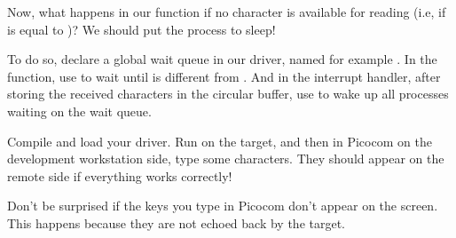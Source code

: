 Now, what happens in our  function if no character is available
for reading (i.e, if  is equal to )? We
should put the process to sleep!

To do so, declare a global wait queue in our driver, named for example
. In the  function, use 
to wait until  is different from . And
in the interrupt handler, after storing the received characters in the
circular buffer, use  to wake up all processes waiting on
the wait queue.

Compile and load your driver. Run  on the target,
and then in Picocom on the development workstation side, type some
characters. They should appear on the remote side if everything works
correctly!

Don't be surprised if the keys you type in Picocom don't appear on the
screen. This happens because they are not echoed back by the target.
